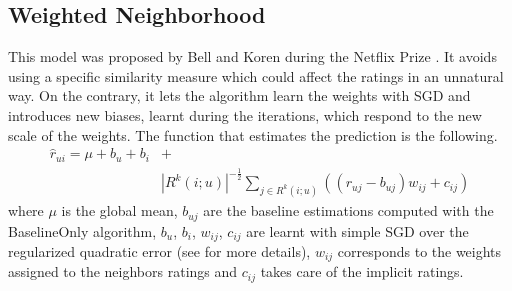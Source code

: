 \documentclass[10pt,conference,compsocconf]{IEEEtran}
\begin{document}
\subsection{Weighted Neighborhood}
This model was proposed by Bell and Koren during the Netflix Prize \cite{koren2008factorization, koren2010factor}. It avoids using a specific similarity measure which could affect the ratings in an unnatural way. On the contrary, it lets the algorithm learn the weights with SGD and introduces new biases, learnt during the iterations, which respond to the new scale of the weights. The function that estimates the prediction is the following.
\begin{align}
\hat{r}_{ui} = \mu + b_{u} + b_{i} &+ \nonumber\\
&|R^{k}(i;u)|^{-\frac{1}{2}} \sum_{j \in R^{k}(i;u) }((r_{uj}-b_{uj})w_{ij} + c_{ij})
\end{align}
where $\mu$ is the global mean, $b_{uj}$ are the baseline estimations computed with the BaselineOnly algorithm, $b_{u}$, $b_{i}$, $w_{ij}$, $c_{ij}$ are learnt with simple SGD over the regularized quadratic error (see \cite{koren2008factorization,koren2010factor} for more details), $w_{ij}$ corresponds to the weights assigned to the neighbors ratings and $c_{ij}$ takes care of the implicit ratings.
\end{document}
